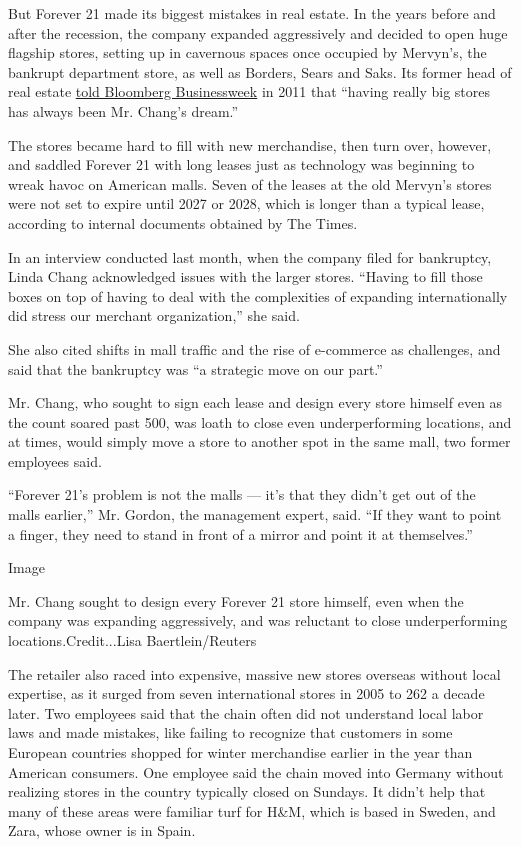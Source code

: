 But Forever 21 made its biggest mistakes in real estate. In the years
before and after the recession, the company expanded aggressively and
decided to open huge flagship stores, setting up in cavernous spaces
once occupied by Mervyn's, the bankrupt department store, as well as
Borders, Sears and Saks. Its former head of real estate
\href{https://webcache.googleusercontent.com/search?q=cache:MSSRC9kqzfoJ:https://www.bloomberg.com/news/articles/2011-01-20/forever-21s-fast-and-loose-fashion-empire+\&cd=1\&hl=en\&ct=clnk\&gl=us}{told
Bloomberg Businessweek} in 2011 that ``having really big stores has
always been Mr. Chang's dream.''

The stores became hard to fill with new merchandise, then turn over,
however, and saddled Forever 21 with long leases just as technology was
beginning to wreak havoc on American malls. Seven of the leases at the
old Mervyn's stores were not set to expire until 2027 or 2028, which is
longer than a typical lease, according to internal documents obtained by
The Times.

In an interview conducted last month, when the company filed for
bankruptcy, Linda Chang acknowledged issues with the larger stores.
``Having to fill those boxes on top of having to deal with the
complexities of expanding internationally did stress our merchant
organization,'' she said.

She also cited shifts in mall traffic and the rise of e-commerce as
challenges, and said that the bankruptcy was ``a strategic move on our
part.''

Mr. Chang, who sought to sign each lease and design every store himself
even as the count soared past 500, was loath to close even
underperforming locations, and at times, would simply move a store to
another spot in the same mall, two former employees said.

``Forever 21's problem is not the malls --- it's that they didn't get
out of the malls earlier,'' Mr. Gordon, the management expert, said.
``If they want to point a finger, they need to stand in front of a
mirror and point it at themselves.''

Image

Mr. Chang sought to design every Forever 21 store himself, even when the
company was expanding aggressively, and was reluctant to close
underperforming locations.Credit...Lisa Baertlein/Reuters

The retailer also raced into expensive, massive new stores overseas
without local expertise, as it surged from seven international stores in
2005 to 262 a decade later. Two employees said that the chain often did
not understand local labor laws and made mistakes, like failing to
recognize that customers in some European countries shopped for winter
merchandise earlier in the year than American consumers. One employee
said the chain moved into Germany without realizing stores in the
country typically closed on Sundays. It didn't help that many of these
areas were familiar turf for H\&M, which is based in Sweden, and Zara,
whose owner is in Spain.

